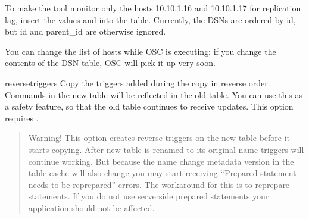 \documentclass[letterpaper,10pt,english]{sphinxmanual}
\begin{document}
\begin{fulllineitems}
\begin{sphinxVerbatim}[commandchars=\\\{\}]
   
      
     
     
    
\end{sphinxVerbatim}

To make the tool monitor only the hosts 10.10.1.16 and 10.10.1.17 for
replication lag, insert the values  and  into the
table. Currently, the DSNs are ordered by id, but id and parent\_id are otherwise
ignored.

You can change the list of hosts while OSC is executing:
if you change the contents of the DSN table, OSC will pick it up very soon.

\end{fulllineitems}


\textendash{}reverse\sphinxhyphen{}triggers Copy the triggers added during the copy in reverse order. Commands in the new table will be
reflected in the old table. You can use this as a safety feature, so that the old
table continues to receive updates. This option requires .
\begin{quote}

Warning! This option creates reverse triggers on the new table before it starts copying.
After new table is renamed to its original name triggers will continue working. But because the
name change metadata version in the table cache will also change you may start receiving
“Prepared statement needs to be re\sphinxhyphen{}prepared” errors. The workaround for this is to re\sphinxhyphen{}prepare statements.
If you do not use server\sphinxhyphen{}side prepared statements your application should not be affected.
\end{quote}
\end{document}
